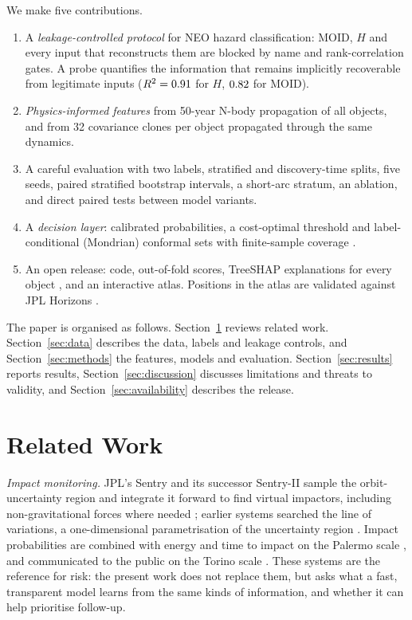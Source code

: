 \documentclass[journal]{IEEEtran}
\begin{document}
We make five contributions.
\begin{enumerate}
\item A \emph{leakage-controlled protocol} for NEO hazard classification: MOID, $H$ and every input that reconstructs them are blocked by name and rank-correlation gates. A probe quantifies the information that remains implicitly recoverable from legitimate inputs ($R^2=0.91$ for $H$, $0.82$ for MOID).
\item \emph{Physics-informed features} from 50-year N-body propagation of all \NObj{} objects, and from 32 covariance clones per object propagated through the same dynamics.
\item A careful evaluation with two labels, stratified and discovery-time splits, five seeds, paired stratified bootstrap intervals, a short-arc stratum, an ablation, and direct paired tests between model variants.
\item A \emph{decision layer}: calibrated probabilities, a cost-optimal threshold and label-conditional (Mondrian) conformal sets with finite-sample coverage \cite{vovk2005,angelopoulos2023}.
\item An open release: code, out-of-fold scores, TreeSHAP explanations for every object \cite{lundberg2020}, and an interactive atlas. Positions in the atlas are validated against JPL Horizons \cite{jplhorizons}.
\end{enumerate}

The paper is organised as follows. Section~\ref{sec:related} reviews related work. Section~\ref{sec:data} describes the data, labels and leakage controls, and Section~\ref{sec:methods} the features, models and evaluation. Section~\ref{sec:results} reports results, Section~\ref{sec:discussion} discusses limitations and threats to validity, and Section~\ref{sec:availability} describes the release.

\section{Related Work}\label{sec:related}
\emph{Impact monitoring.} JPL's Sentry and its successor Sentry-II sample the orbit-uncertainty region and integrate it forward to find virtual impactors, including non-gravitational forces where needed \cite{roa2021}; earlier systems searched the line of variations, a one-dimensional parametrisation of the uncertainty region \cite{milani2005}. Impact probabilities are combined with energy and time to impact on the Palermo scale \cite{chesley2002}, and communicated to the public on the Torino scale \cite{binzel2000}. These systems are the reference for risk: the present work does not replace them, but asks what a fast, transparent model learns from the same kinds of information, and whether it can help prioritise follow-up.
\end{document}
